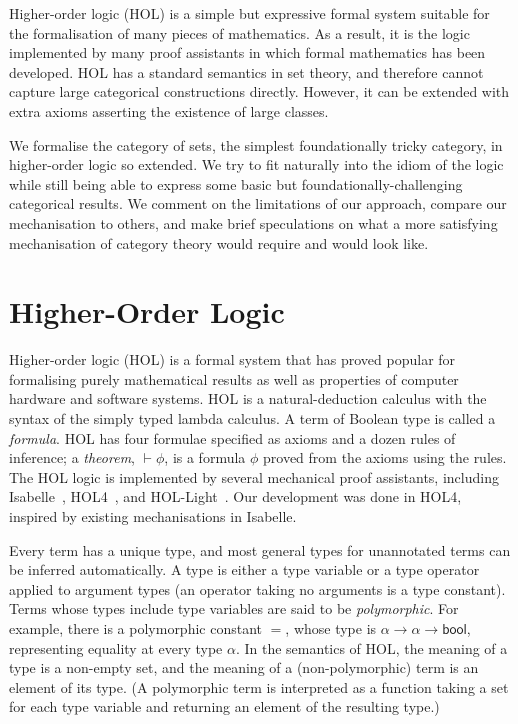 \documentclass[twoside,titlepage,11pt]{article}
\begin{document}
Higher-order logic (HOL) is a simple but expressive formal system suitable for the formalisation of many pieces of mathematics.
As a result, it is the logic implemented by many proof assistants in which formal mathematics has been developed.
HOL has a standard semantics in set theory, and therefore cannot capture large categorical constructions directly.
However, it can be extended with extra axioms asserting the existence of large classes.

We formalise the category of sets, the simplest foundationally tricky category, in higher-order logic so extended.
We try to fit naturally into the idiom of the logic while still being able to express some basic but foundationally-challenging categorical results.
We comment on the limitations of our approach, compare our mechanisation to others, and make brief speculations on what a more satisfying mechanisation of category theory would require and would look like.
\section{Higher-Order Logic}%
\newcommand{\bool}{\ensuremath{\mathsf{bool}}}
Higher-order logic (HOL) is a formal system that has proved popular for formalising purely mathematical results as well as properties of computer hardware and software systems.
HOL is a natural-deduction calculus with the syntax of the simply typed lambda calculus.
A term of Boolean type is called a \emph{formula}.
HOL has four formulae specified as axioms and a dozen rules of inference; a \emph{theorem}, $\vdash\phi$, is a formula $\phi$ proved from the axioms using the rules.
The HOL logic is implemented by several mechanical proof assistants, including Isabelle~\cite{DBLP:conf/tphol/WenzelPN08}, HOL4~\cite{DBLP:conf/tphol/SlindN08}, and HOL-Light~\cite{DBLP:conf/tphol/Harrison09a}.
Our development was done in HOL4, inspired by existing mechanisations \cite{Katovsky,DBLP:journals/entcs/OKeefe04} in Isabelle.

Every term has a unique type, and most general types for unannotated terms can be inferred automatically.
A type is either a type variable or a type operator applied to argument types (an operator taking no arguments is a type constant).
Terms whose types include type variables are said to be \emph{polymorphic}.
For example, there is a polymorphic constant $=$, whose type is $\alpha\to\alpha\to\bool$, representing equality at every type $\alpha$.
In the semantics of HOL, the meaning of a type is a non-empty set, and the meaning of a (non-polymorphic) term is an element of its type.
(A polymorphic term is interpreted as a function taking a set for each type variable and returning an element of the resulting type.)
\end{document}
